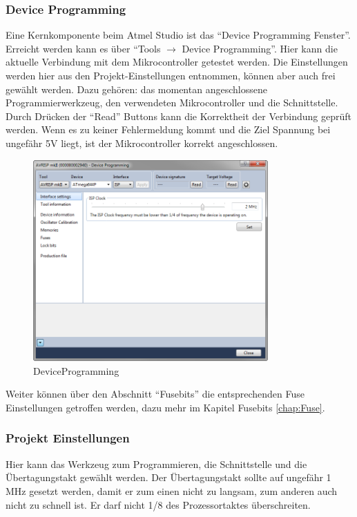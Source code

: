 \subsubsection{Device Programming}
\label{Chap:atmelStudio.Programming}

Eine Kernkomponente beim Atmel Studio ist das "`Device Programming Fenster"'.
Erreicht werden kann es über "`Tools $\to$  Device Programming"'.
Hier kann die aktuelle Verbindung mit dem Mikrocontroller getestet werden. Die
Einstellungen werden hier aus den Projekt-Einstellungen entnommen, können aber
auch frei gewählt werden. Dazu gehören: das momentan
angeschlossene Programmierwerkzeug, den verwendeten Mikrocontroller und die
Schnittstelle. Durch Drücken der "`Read"' Buttons kann die Korrektheit der
Verbindung geprüft werden. Wenn es zu keiner Fehlermeldung kommt und die Ziel
Spannung bei ungefähr 5V liegt, ist der Mikrocontroller korrekt
angeschlossen.

\begin{figure}[H]
\centering
\includegraphics[width=9cm]{content/pictures/Anleitung/neuerProzessor/AnleitungNeuerProzessor1.png}
\caption{DeviceProgramming}
\label{fig:B3}
\end{figure}

Weiter können über den Abschnitt "`Fusebits"' die entsprechenden Fuse Einstellungen
getroffen werden, dazu mehr im Kapitel Fusebits \ref{chap:Fuse}.


\subsubsection{Projekt Einstellungen}

Hier kann das Werkzeug zum Programmieren, die Schnittstelle und
die Übertagungstakt gewählt werden.
Der Übertagungstakt sollte auf ungefähr 1 MHz gesetzt werden, damit er zum
einen nicht zu langsam, zum anderen auch nicht zu schnell ist. Er darf nicht 1/8 des
Prozessortaktes überschreiten.

